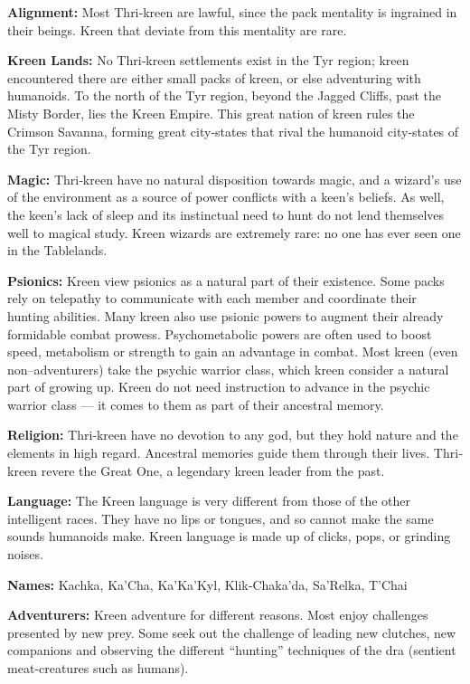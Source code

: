 \documentclass[10pt,a4paper,twocolumn]{d20}
\begin{document}
{\textbf{Alignment:} Most Thri‐kreen are lawful, since the pack mentality is ingrained in their beings. Kreen that deviate from this mentality are rare.

\textbf{Kreen Lands:} No Thri‐kreen settlements exist in the Tyr region; kreen encountered there are either small packs of kreen, or else adventuring with humanoids. To the north of the Tyr region, beyond the Jagged Cliffs, past the Misty Border, lies the Kreen Empire. This great nation of kreen rules the Crimson Savanna, forming great city‐states that rival the humanoid city‐states of the Tyr region.

\textbf{Magic:} Thri‐kreen have no natural disposition towards magic, and a wizard’s use of the environment as a source of power conflicts with a keen’s beliefs. As well, the keen’s lack of sleep and its instinctual need to hunt do not lend themselves well to magical study. Kreen wizards are extremely rare: no one has ever seen one in the Tablelands.

\textbf{Psionics:} Kreen view psionics as a natural part of their existence. Some packs rely on telepathy to communicate with each member and coordinate their hunting abilities. Many kreen also use psionic powers to augment their already formidable combat prowess. Psychometabolic powers are often used to boost speed, metabolism or strength to gain an advantage in combat. Most kreen (even non–adventurers) take the psychic warrior class, which kreen consider a natural part of growing up. Kreen do not need instruction to advance in the psychic warrior class --- it comes to them as part of their ancestral memory.

\textbf{Religion:} Thri‐kreen have no devotion to any god, but they hold nature and the elements in high regard. Ancestral memories guide them through their lives. Thri‐kreen revere the Great One, a legendary kreen leader from the past.

\textbf{Language:} The Kreen language is very different from those of the other intelligent races. They have no lips or tongues, and so cannot make the same sounds humanoids make. Kreen language is made up of clicks, pops, or grinding noises.

\textbf{Names:} Kachka, Ka’Cha, Ka’Ka’Kyl, Klik‐Chaka’da, Sa’Relka, T’Chai

\textbf{Adventurers:} Kreen adventure for different reasons. Most enjoy challenges presented by new prey. Some seek out the challenge of leading new clutches, new companions and observing the different ``hunting'' techniques of the dra (sentient meat‐creatures such as humans).

}
\end{document}

